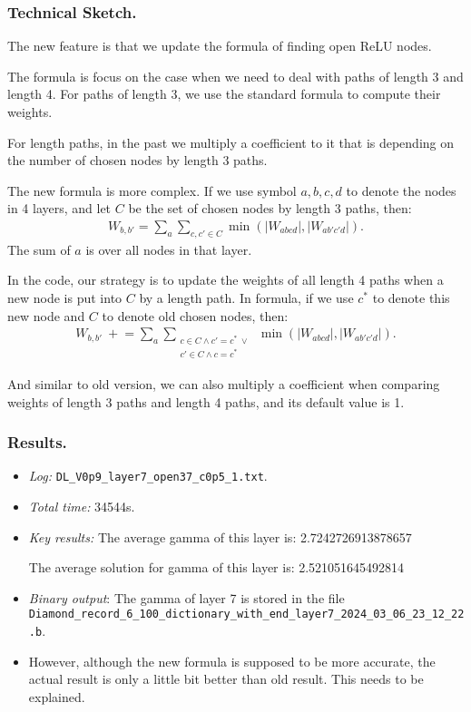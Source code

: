 \documentclass{llncs}
\begin{document}
\subsubsection*{Technical Sketch.}

The new feature is that we update the formula of finding open ReLU nodes.

The formula is focus on the case when we need to deal with paths of length 3 and length 4. For paths of length 3, we use the standard formula to compute their weights.

For length paths, in the past we multiply a coefficient  to it that is depending on the number of chosen nodes by length 3 paths.

The new formula is more complex. If we use symbol $a,b,c,d$ to denote the nodes in 4 layers, and let $C$ be the set of chosen nodes by length 3 paths, then: \begin{align*}
	W_{b,b'} = \sum_{a} \sum_{c,c'\in C} \min (|W_{abcd}|,|W_{ab'c'd}|).
\end{align*} The sum of $a$ is over all nodes in that layer.


In the code, our strategy is to update the weights of all length 4 paths when a new node is put into $C$ by a length path. In formula, if we use $c^*$ to denote this new node and $C$ to denote old chosen nodes, then: \begin{align*}
	W_{b,b'}\  +\!\!= \sum_{a} \sum_{\substack{c\in C \wedge c'= c^* \ \vee\ \\c'\in C \wedge c= c^*}} \min (|W_{abcd}|,|W_{ab'c'd}|).
\end{align*}

And similar to old version, we can also multiply a coefficient when comparing weights of length 3 paths and length 4 paths, and its default value is 1. 



\subsubsection*{Results.}


\begin{itemize}
	\item \emph{Log:} \verb*|DL_V0p9_layer7_open37_c0p5_1.txt|.
	
	\item \emph{Total time:} 34544s.
	
	\item \emph{Key results:}  The average gamma of this layer is:  2.7242726913878657
	
	The average solution for gamma of this layer is:  2.521051645492814
	
	\item  \emph{Binary output}: The gamma of layer 7 is stored in the file \verb*|Diamond_record_6_100_dictionary_with_end_layer7_2024_03_06_23_12_22.b|.
	
	\item  However, although the new formula is supposed to be more accurate, the actual result is only a little bit better than old result. This needs to be explained.
	
\end{itemize}
\end{document}

